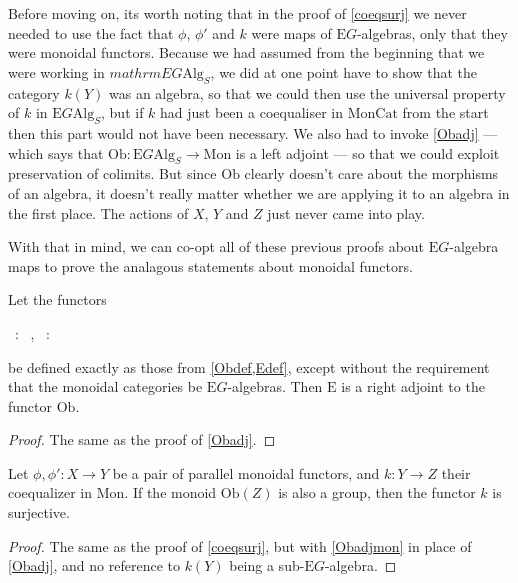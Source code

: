 Before moving on, its worth noting that in the proof of \cref{coeqsurj} we never needed to use the fact that $\phi$, $\phi'$ and $k$ were maps of $\mathrm{E}G$-algebras, only that they were monoidal functors. Because we had assumed from the beginning that we were working in $mathrm{E}G\mathrm{Alg}_S$, we did at one point have to show that the category $k(Y)$ was an algebra, so that we could then use the universal property of $k$ in $\mathrm{E}G\mathrm{Alg}_S$, but if $k$ had just been a coequaliser in $\mathrm{MonCat}$ from the start then this part would not have been necessary. We also had to invoke \cref{Obadj} --- which says that $\mathrm{Ob}: \mathrm{E}G\mathrm{Alg}_S \to \mathrm{Mon}$ is a left adjoint --- so that we could exploit preservation of colimits. But since $\mathrm{Ob}$ clearly doesn't care about the morphisms of an algebra, it doesn't really matter whether we are applying it to an algebra in the first place. The actions of $X$, $Y$ and $Z$ just never came into play.

With that in mind, we can co-opt all of these previous proofs about $\mathrm{E}G$-algebra maps to prove the analagous statements about monoidal functors.

\begin{prop}\label{Obadjmon} Let the functors 
\begin{eq*}  \, : \,  \to {}, \quad \quad \quad {} \, : \,  \to {} \end{eq*}
be defined exactly as those from \cref{Obdef,Edef}, except without the requirement that the monoidal categories be $\mathrm{E}G$-algebras. Then $\mathrm{E}$ is a right adjoint to the functor $\mathrm{Ob}$. 
\end{prop}
\begin{proof}
The same as the proof of \cref{Obadj}.
\end{proof}

\begin{prop} \label{coeqsurjmon} Let $\phi, \phi' : X \to Y$ be a pair of parallel monoidal functors, and $k: Y \to Z$ their coequalizer in $\mathrm{Mon}$. If the monoid $\mathrm{Ob}(Z)$ is also a group, then the functor $k$ is surjective.
\end{prop}
\begin{proof}
The same as the proof of \cref{coeqsurj}, but with \cref{Obadjmon} in place of \cref{Obadj}, and no reference to $k(Y)$ being a sub-$\mathrm{E}G$-algebra.
\end{proof}